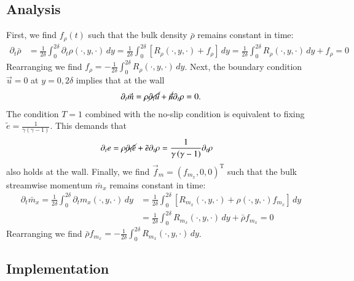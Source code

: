 \documentclass[letterpaper,11pt,nointlimits,reqno]{amsart}
\begin{document}
\subsection*{Analysis}

First, we find $f_{\rho}(t)$ such that the bulk density $\bar{\rho}$
remains constant in time:
\begin{align}
  \partial_{t} \bar{\rho}
  &= \frac{1}{2\delta} \int_{0}^{2\delta}
     \partial_{t} \rho\!\left(\cdot,y,\cdot\right) \, dy
   = \frac{1}{2\delta} \int_{0}^{2\delta}
     \left[ R_{\rho}\!\left(\cdot,y,\cdot\right) + f_{\rho} \right] \, dy
   = \frac{1}{2\delta} \int_{0}^{2\delta}
     R_{\rho}\!\left(\cdot,y,\cdot\right) \, dy + f_{\rho}
   = 0
\end{align}
Rearranging we find $f_{\rho} = - \frac{1}{2\delta} \int_{0}^{2\delta}
R_{\rho}\!\left(\cdot,y,\cdot\right) \, dy$.  Next, the boundary condition
$\vec{u} = 0$ at $y = 0,2\delta$ implies that at the wall
\begin{align}
  \partial_{t} \vec{m}
  =   \rho \cancel{\partial_{t} \vec{u}}
    + \cancel{\vec{u}} \partial_{t} \rho
  = 0.
\end{align}
The condition $T=1$ combined with the no-slip condition is equivalent to fixing
$\tilde{e}=\frac{1}{\gamma\left(\gamma-1\right)}$.  This demands that
\begin{align}
  \partial_{t} e
  &=  \rho \cancel{\partial_{t} \tilde{e}}
    + \tilde{e} \partial_{t} \rho
  = \frac{1}{\gamma\left(\gamma-1\right)} \partial_{t} \rho
\end{align}
also holds at the wall.  Finally, we find $\vec{f}_{m} =
\left(f_{m_x},0,0\right)^{\textrm{T}}$ such that the bulk streamwise momentum
$\bar{m}_{x}$ remains constant in time:
\begin{align}
  \partial_{t} \bar{m}_x
   = \frac{1}{2\delta} \int_{0}^{2\delta}
     \partial_{t} m_{x} \!\left(\cdot,y,\cdot\right) \, dy
  &= \frac{1}{2\delta} \int_{0}^{2\delta}
     \left[  R_{m_x}\!\left(\cdot,y,\cdot\right)
           + \rho\!\left(\cdot,y,\cdot\right)  f_{m_x}
     \right] \, dy
  \\
  &= \frac{1}{2\delta} \int_{0}^{2\delta}
     R_{m_x}\!\left(\cdot,y,\cdot\right) \, dy + \bar{\rho} f_{m_x}
   = 0
\end{align}
Rearranging we find $\bar{\rho} f_{m_x} = - \frac{1}{2\delta}
\int_{0}^{2\delta} R_{m_x}\!\left(\cdot,y,\cdot\right) \, dy$.

\subsection*{Implementation}
\end{document}
